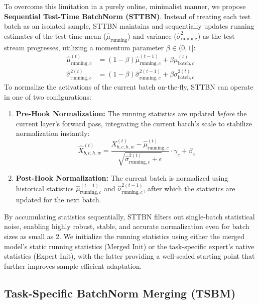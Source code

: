 \documentclass{article}
\theoremstyle{plain}
\theoremstyle{definition}
\theoremstyle{remark}
\begin{document}
To overcome this limitation in a purely online, minimalist manner, we propose \textbf{Sequential Test-Time BatchNorm (STTBN)}. Instead of treating each test batch as an isolated sample, STTBN maintains and sequentially updates running estimates of the test-time mean ($\hat{\mu}_{\text{running}}$) and variance ($\hat{\sigma}^2_{\text{running}}$) as the test stream progresses, utilizing a momentum parameter $\beta \in (0, 1]$:
\begin{align}
    \hat{\mu}_{\text{running}, c}^{(t)} &= (1 - \beta) \hat{\mu}_{\text{running}, c}^{(t-1)} + \beta \mu_{\text{batch}, c}^{(t)} \\
    \hat{\sigma}^{2(t)}_{\text{running}, c} &= (1 - \beta) \hat{\sigma}^{2(t-1)}_{\text{running}, c} + \beta \sigma^{2(t)}_{\text{batch}, c}
\end{align}
To normalize the activations of the current batch on-the-fly, STTBN can operate in one of two configurations:
\begin{enumerate}
    \item \textbf{Pre-Hook Normalization:} The running statistics are updated \textit{before} the current layer's forward pass, integrating the current batch's scale to stabilize normalization instantly:
    \begin{equation}
        \hat{X}_{b, c, h, w}^{(t)} = \frac{X_{b, c, h, w}^{(t)} - \hat{\mu}_{\text{running}, c}^{(t)}}{\sqrt{\hat{\sigma}^{2(t)}_{\text{running}, c} + \epsilon}} \cdot \gamma_c + \beta_c
    \end{equation}
    \item \textbf{Post-Hook Normalization:} The current batch is normalized using historical statistics $\hat{\mu}_{\text{running}, c}^{(t-1)}$ and $\hat{\sigma}^{2(t-1)}_{\text{running}, c}$, after which the statistics are updated for the next batch.
\end{enumerate}

By accumulating statistics sequentially, STTBN filters out single-batch statistical noise, enabling highly robust, stable, and accurate normalization even for batch sizes as small as 2. We initialize the running statistics using either the merged model's static running statistics (Merged Init) or the task-specific expert's native statistics (Expert Init), with the latter providing a well-scaled starting point that further improves sample-efficient adaptation.
\subsection{Task-Specific BatchNorm Merging (TSBM)}
\end{document}
